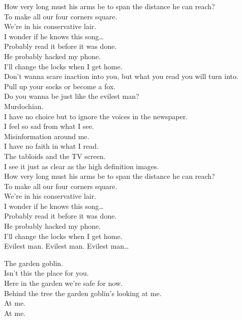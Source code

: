 How very long must his arms be to span the distance he can reach? \\
To make all our four corners square. \\
We're in his conservative lair. \\
I wonder if he knows this song… \\
Probably read it before it was done. \\
He probably hacked my phone. \\
I'll change the locks when I get home. \\

Don't wanna scare inaction into you, but what you read you will turn into. \\
Pull up your socks or become a fox. \\
Do you wanna be just like the evilest man? \\
Murdochian. \\

I have no choice but to ignore the voices in the newspaper. \\
I feel so sad from what I see. \\
Misinformation around me. \\
I have no faith in what I read. \\
The tabloids and the TV screen. \\
I see it just as clear as the high definition images. \\
How very long must his arms be to span the distance he can reach? \\
To make all our four corners square. \\
We're in his conservative lair. \\
I wonder if he knows this song… \\
Probably read it before it was done. \\
He probably hacked my phone. \\
I'll change the locks when I get home. \\

Evilest man. Evilest man. Evilest man… \\




The garden goblin. \\

Isn't this the place for you. \\
Here in the garden we're safe for now. \\
Behind the tree the garden goblin's looking at me. \\
At me. \\
At me. \\

